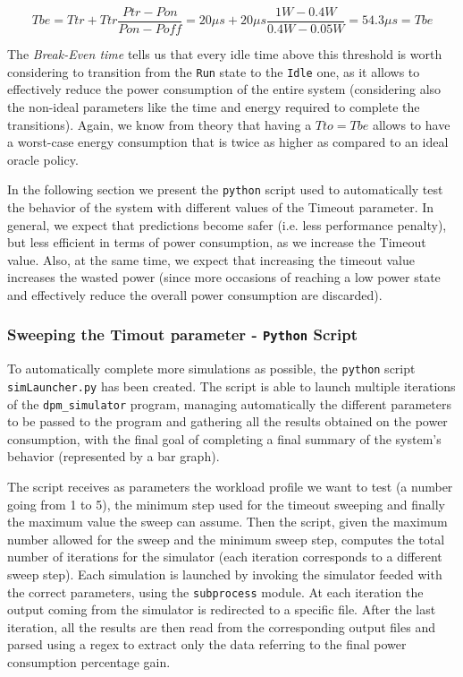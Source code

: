 \documentclass[a4paper]{article}
\begin{document}
            \begin{equation}
                Tbe = Ttr + Ttr \frac{Ptr - Pon}{Pon - Poff} = 20 \mu s + 20 \mu s \frac{1W - 0.4W}{0.4W - 0.05W} = 54.3 \mu s = Tbe
            \end{equation}

            The \emph{Break-Even time} tells us that every idle time above this threshold is worth considering to transition from the \texttt{Run} state to the \texttt{Idle} one, as it allows to effectively reduce the power consumption of the entire system (considering also the non-ideal parameters like the time and energy required to complete the transitions). Again, we know from theory that having a $Tto = Tbe$ allows to have a worst-case energy consumption that is twice as higher as compared to an ideal oracle policy.

            In the following section we present the \texttt{python} script used to automatically test the behavior of the system with different values of the Timeout parameter. In general, we expect that predictions become safer (i.e. less performance penalty), but less efficient in terms of power consumption, as we increase the Timeout value. Also, at the same time, we expect that increasing the timeout value increases the wasted power (since more occasions of reaching a low power state and effectively reduce the overall power consumption are discarded).

        \subsubsection{Sweeping the Timout parameter - \texttt{Python} Script}
            To automatically complete more simulations as possible, the \texttt{python} script \texttt{simLauncher.py} has been created. The script is able to launch multiple iterations of the \texttt{dpm\_simulator} program, managing automatically the different parameters to be passed to the program and gathering all the results obtained on the power consumption, with the final goal of completing a final summary of the system's behavior (represented by a bar graph).

            The script receives as parameters the workload profile we want to test (a number going from 1 to 5), the minimum step used for the timeout sweeping and finally the maximum value the sweep can assume. Then the script, given the maximum number allowed for the sweep and the minimum sweep step, computes the total number of iterations for the simulator (each iteration corresponds to a different sweep step). Each simulation is launched by invoking the simulator feeded with the correct parameters, using the \texttt{subprocess} module.
            At each iteration the output coming from the simulator is redirected to a specific file.
            After the last iteration, all the results are then read from the corresponding output files and parsed using a regex to extract only the data referring to the final power consumption percentage gain.
\end{document}
